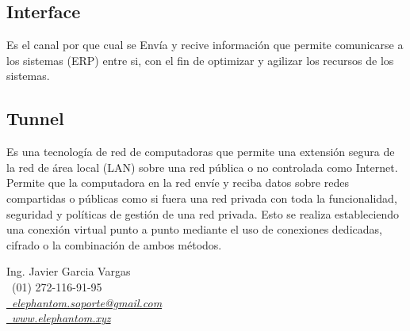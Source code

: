 \documentclass[12pt,letterpaper]{article}
\newcommand{\myequations}[1]{%
\addcontentsline{equ}{myequations}{\protect\numberline{\theequation}#1}\par}
\begin{document}
  \newpage
    \begin{section}{\color{kblue}}
    \sffamily
    {
      \subsection{Interface} Es el canal por que cual se Env\'ia y recive informaci\'on que permite comunicarse a los sistemas (ERP) entre si, con el fin de optimizar y agilizar los recursos de los sistemas.\\
      \subsection{Tunnel} Es una tecnolog\'ia de red de computadoras que permite una extensi\'on segura de la red de \'area local (LAN) sobre una red p\'ublica o no controlada como Internet.
      Permite que la computadora en la red env\'ie y reciba datos sobre redes compartidas o p\'ublicas como si fuera una red privada con toda la funcionalidad, seguridad y
      pol\'iticas de gesti\'on de una red privada.
      Esto se realiza estableciendo una conexi\'on virtual punto a punto mediante el uso de conexiones dedicadas, cifrado o la combinaci\'on de ambos métodos.
    }
    \end{section}

    \newpage
      \begin{section}{\color{kblue}}
      \sffamily
      {
        Ing. Javier Garcia Vargas \\
        \color{asome}\faMobile\ (01) 272-116-91-95 \\
        \href{mailto:elephantom.soporte@gmail.com}{\color{asome}\faEnvelope\ \emph{elephantom.soporte@gmail.com}} \\
        \href{http://elephantom.xyz}{\color{asome}\faCloud\ \emph{www.elephantom.xyz}} \\
      }
      \end{section}

%
%





%
\end{document}
